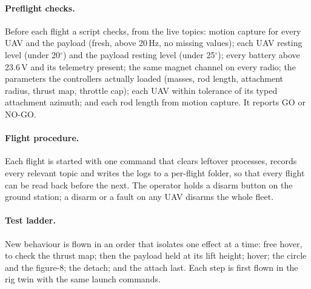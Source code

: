 \paragraph{Preflight checks.} Before each flight a script checks, from the live topics:
motion capture for every UAV and the payload (fresh, above 20\,Hz, no missing values); each UAV
resting level (under 20$^\circ$) and the payload resting level (under 25$^\circ$); every battery
above 23.6\,V and its telemetry present; the same magnet channel on every radio; the parameters the
controllers actually loaded (masses, rod length, attachment radius, thrust map, throttle cap);
each UAV within tolerance of its typed attachment azimuth; and each rod length from motion capture.
It reports GO or NO-GO.

\paragraph{Flight procedure.} Each flight is started with one command that clears leftover
processes, records every relevant topic and writes the logs to a per-flight folder, so that every
flight can be read back before the next. The operator holds a disarm button on the ground station;
a disarm or a fault on any UAV disarms the whole fleet.

\paragraph{Test ladder.} New behaviour is flown in an order that isolates one effect at a time:
free hover, to check the thrust map; then the payload held at its lift height; hover; the circle and
the figure-8; the detach; and the attach last. Each step is first flown in the rig twin with the
same launch commands.
